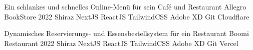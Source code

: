 

\begin{cventries}

\cventry
{Ein schlankes und schnelles Online-Menü für sein Café und Restaurant} %
{Allegro BookStore} %
{2022} %
{Shiraz} %
{
  NextJS \mitdiv ReactJS \mitdiv TailwindCSS \mitdiv Adobe XD \mitdiv Git \mitdiv Cloudflare
}

\cventry
{Dynamisches Reservierungs- und Essensbestellsystem für ein Restaurant} %
{Boomi Restaurant} %
{2022} %
{Shiraz} %
{
  NextJS \mitdiv ReactJS \mitdiv TailwindCSS \mitdiv Adobe XD \mitdiv Git \mitdiv Vercel
}


\end{cventries}
